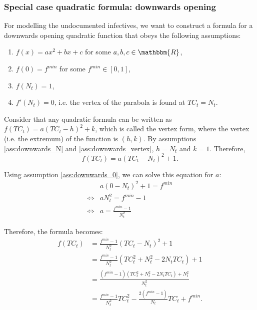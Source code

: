 \documentclass[12pt]{article}
\newcommand{\R}{\mathbbm{R}}
\begin{document}
\begin{appendices}
		\subsubsection{Special case quadratic formula: downwards opening} \label{ssapp:downwards_derivation_vertex}
		For modelling the undocumented infectives, we want to construct a formula for a downwards opening quadratic function that obeys the following assumptions:
		\begin{enumerate}[label=(\Roman*)]
		    \item\label{ass:downwards_formula} $f(x) = ax^2 + bx + c$  for some $a, b, c \in \R$,
		    \item\label{ass:downwards_0} $f(0) = f^{min}$ for some $f^{min} \in [0,1]$,
		    \item\label{ass:downwards_N} $f(N_t) = 1$,
		    \item\label{ass:downwards_vertex} $f'(N_t) = 0$, i.e. the vertex of the parabola is found at $TC_t = N_t$.
		\end{enumerate}
		
		Consider that any quadratic formula can be written as $f(TC_t) = a(TC_t - h)^2 + k$, which is called the vertex form, where the vertex (i.e. the extremum) of the function is $(h, k)$. By assumptions \ref{ass:downwards_N} and \ref{ass:downwards_vertex}, $h=N_t$ and $k=1$. Therefore,
		    \[f(TC_t) = a(TC_t - N_t)^2 + 1.\]
		    
		Using assumption \ref{ass:downwards_0}, we can solve this equation for $a$:
		    \begin{align*}
		        & a(0 - N_t)^2 + 1 = f^{min}\\
		        \iff & aN_t^2 = f^{min} - 1\\
		        \iff & a = \frac{f^{min} - 1}{N_t^2}
		    \end{align*}
		    
		Therefore, the formula becomes:
		    \begin{align*}
		        f(TC_t) &= \frac{f^{min} - 1}{N_t^2}(TC_t - N_t)^2 + 1 \\
		        &= \frac{f^{min} - 1}{N_t^2}(TC_t^2 + N_t^2 -2N_tTC_t) + 1 \\
		        &= \frac{(f^{min} - 1)(TC_t^2 + N_t^2 -2N_tTC_t) + N_t^2}{N_t^2}\\
                &= \frac{f^{min} - 1}{N_t^2}TC_t^2 - \frac{2(f^{min} - 1)}{N_t}TC_t + f^{min}.
		    \end{align*}
		

\end{appendices}
\end{document}
